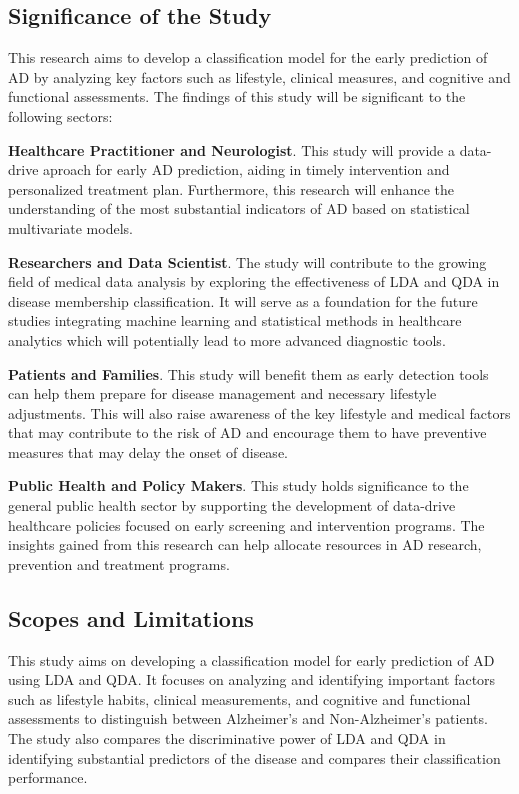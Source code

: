 \documentclass[12pt]{article}
\begin{document}
\subsection{Significance of the Study}
\noindent

This research aims to develop a classification model for the early prediction of AD by analyzing key factors such as lifestyle, clinical measures, and cognitive and functional assessments. 
The findings of this study will be significant to the following sectors: 

\textbf{Healthcare Practitioner and Neurologist}. This study will provide a data-drive aproach for early AD prediction, aiding in timely intervention and personalized treatment plan. Furthermore, 
this research will enhance the understanding of the most substantial indicators of AD based on statistical multivariate models. 

\textbf{Researchers and Data Scientist}. The study will contribute to the growing field of medical data analysis by exploring the effectiveness of LDA and QDA in disease membership classification. It 
will serve as a foundation for the future studies integrating machine learning and statistical methods in healthcare analytics which will potentially lead to more advanced diagnostic tools. 

\textbf{Patients and Families}. This study will benefit them as early detection tools can help them prepare for disease management and necessary lifestyle adjustments. This will also raise awareness of the 
key lifestyle and medical factors that may contribute to the risk of AD and encourage them to have preventive measures that may delay the onset of disease.

\textbf{Public Health and Policy Makers}. This study holds significance to the general public health sector by supporting the development of data-drive healthcare policies focused on early screening and intervention
programs. The insights gained from this research can help allocate resources in AD research, prevention and treatment programs.

\subsection{Scopes and Limitations}
\noindent

This study aims on developing a classification model for early prediction of AD using LDA and QDA. It focuses on analyzing and identifying important factors such as lifestyle habits, clinical measurements, and cognitive and 
functional assessments to distinguish between Alzheimer's and Non-Alzheimer's patients. The study also compares the discriminative power of LDA and QDA in identifying substantial predictors of the disease and compares their 
classification performance. 
\end{document}
